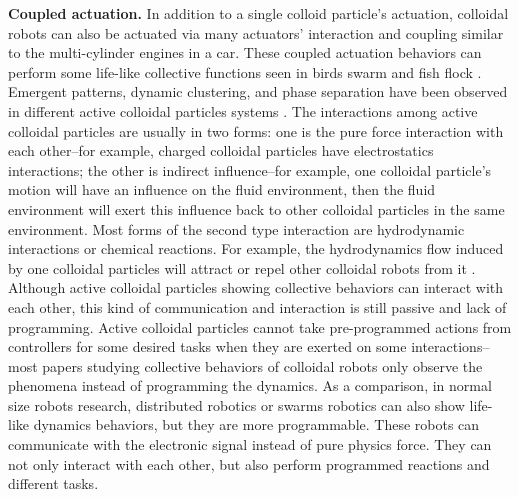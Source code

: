 \textbf{Coupled actuation.}  In addition to a single colloid particle's actuation,  colloidal robots can also be actuated via many actuators' interaction and coupling similar to the multi-cylinder engines in a car. These coupled actuation behaviors can perform some life-like collective functions seen in birds swarm and fish flock \autocite{wang2015one,ginot2018aggregation}. Emergent patterns, dynamic clustering, and phase separation have been observed  in different active colloidal particles systems \autocite{buttinoni2013dynamical,ginot2018aggregation,duan2013transition,theurkauff2012dynamic}. The interactions among active colloidal particles are usually in two forms: one is the pure force interaction with each other--for example, charged colloidal particles have electrostatics interactions\autocite{dou2018emergence}; the other is indirect influence--for example, one colloidal particle's motion  will have an influence on the fluid environment, then  the fluid environment will exert this influence back to other colloidal particles in the same environment. Most forms of the second type interaction are hydrodynamic interactions or chemical reactions. For example, the hydrodynamics flow induced by one colloidal particles will attract or repel other colloidal robots from it \autocite{karani2019tuning}. Although active colloidal particles showing collective behaviors can interact with each other, this kind of communication and interaction is still passive and lack of programming. Active colloidal particles cannot take pre-programmed actions from controllers for some desired tasks when they are exerted on some interactions--most papers studying collective behaviors of colloidal robots only observe the phenomena instead of  programming the dynamics.  As a comparison, in normal size robots research, distributed robotics or  swarms robotics\autocite{wei2010sambot,arvin2014colias} can also show life-like dynamics behaviors, but they are more programmable. These robots can communicate with the electronic signal instead of pure physics force. They can not only interact with each other, but also perform programmed reactions and different tasks\autocite{rubenstein2012kilobot,rubenstein2014programmable,li2019particle}.

